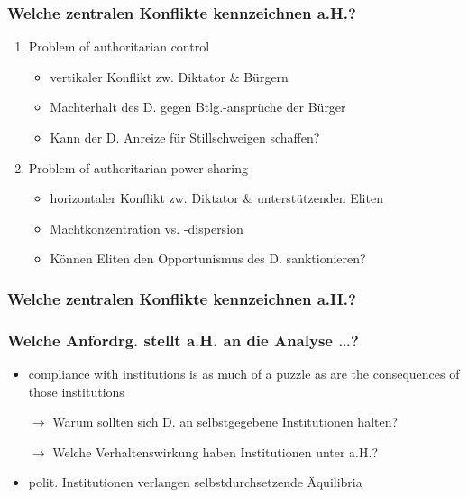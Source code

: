\documentclass{beamer}\usepackage[]{graphicx}\usepackage[]{color}
\begin{document}
\begin{frame}
  \frametitle{Welche zentralen Konflikte kennzeichnen a.H.?}
  \begin{enumerate}
    \item Problem of authoritarian control
    \begin{itemize}
      \item vertikaler Konflikt zw. Diktator \& Bürgern
      \item Machterhalt des D. gegen Btlg.-ansprüche der Bürger
      \item Kann der D. Anreize für Stillschweigen schaffen?
    \end{itemize}
    \item Problem of authoritarian power-sharing
    \begin{itemize}
      \item horizontaler Konflikt zw. Diktator \& unterstützenden Eliten
      \item Machtkonzentration vs. -dispersion
      \item Können Eliten den Opportunismus des D. sanktionieren?
    \end{itemize}
  \end{enumerate}
\end{frame}

\begin{frame}
\frametitle{Welche zentralen Konflikte kennzeichnen a.H.?}
\begin{figure}
\centering
{}
\end{figure}
\end{frame}

\begin{frame}
  \frametitle{Welche Anfordrg. stellt a.H. an die Analyse \dots?}
  \begin{itemize}
    \item {\glqq}compliance with institutions is as much of
      a puzzle as are the consequences of those institutions{\grqq}
    \item[$\rightarrow$] Warum sollten sich D. an selbstgegebene Institutionen halten?
    \item[$\rightarrow$] Welche Verhaltenswirkung haben Institutionen unter a.H.?
    \item polit. Institutionen verlangen selbstdurchsetzende Äquilibria
  \end{itemize}
\end{frame}
\end{document}
